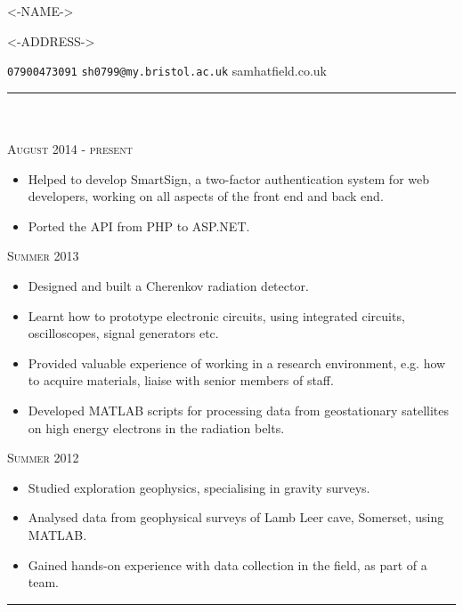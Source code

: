 \documentclass[10pt]{article}
\begin{document}
\LARGE\centerline{<-NAME->}
\normalsize \centerline{<-ADDRESS->}
\centerline{\texttt{07900473091}   \hspace{3mm} \texttt{sh0799@my.bristol.ac.uk}\hspace{3mm} samhatfield.co.uk}
\noindent

\noindent\rule{505pt}{0.6pt}\\
\\
 \hfill \textsc{August 2014 - present}
\begin{itemize}
\item Helped to develop SmartSign, a two-factor authentication system for web developers, working on all aspects of the front end and back end. 
\item Ported the API from PHP to ASP.NET.
\end{itemize}

 \hfill \textsc{Summer 2013}
\begin{itemize}
		\item Designed and built a Cherenkov radiation detector. 
		\item Learnt how to prototype electronic circuits, using integrated circuits, oscilloscopes, signal generators etc.
		\item Provided valuable experience of working in a research environment, e.g. how to acquire materials, liaise with senior members of staff.
		\item Developed MATLAB scripts for processing data from geostationary satellites on high energy electrons in the radiation belts.
		\end{itemize}

 \hfill \textsc{Summer 2012}
\begin{itemize}
		\item Studied exploration geophysics, specialising in gravity surveys.
		\item Analysed data from geophysical surveys of Lamb Leer cave, Somerset, using MATLAB.
		\item Gained hands-on experience with data collection in the field, as part of a team. 
\end{itemize}

\noindent\rule{505pt}{0.6pt}
\end{document}
